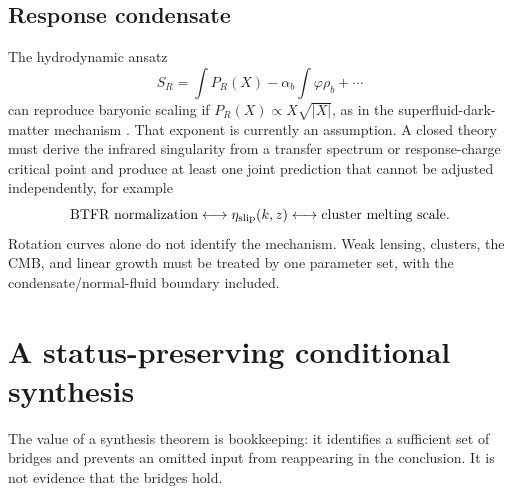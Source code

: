 \subsection{Response condensate}

The hydrodynamic ansatz
\[
 S_R=\int\!P_R(X)-\alpha_b\int\!\varphi\rho_b+\cdots
\]
can reproduce baryonic scaling if
\(P_R(X)\propto X\sqrt{|X|}\), as in the superfluid-dark-matter mechanism
\cite{BerezhianiKhoury}.  That exponent is currently an assumption.
A closed theory must derive the infrared singularity from a transfer spectrum
or response-charge critical point and produce at least one joint prediction
that cannot be adjusted independently, for example
\[
 \text{BTFR normalization}
 \longleftrightarrow
 \eta_{\rm slip}(k,z)
 \longleftrightarrow
 \text{cluster melting scale}.
\]
Rotation curves alone do not identify the mechanism.  Weak lensing,
clusters, the CMB, and linear growth must be treated by one parameter set,
with the condensate/normal-fluid boundary included.

\section{A status-preserving conditional synthesis}
\label{sec:updated-synthesis}

The value of a synthesis theorem is bookkeeping: it identifies a sufficient
set of bridges and prevents an omitted input from reappearing in the
conclusion.  It is not evidence that the bridges hold.

